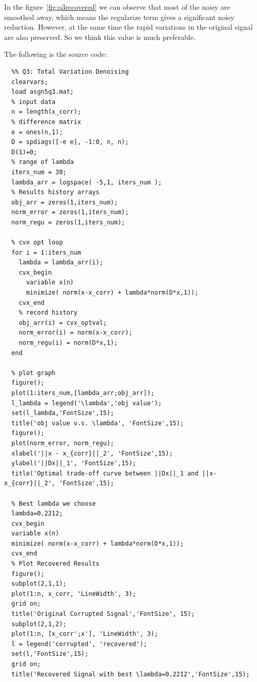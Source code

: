 \documentclass[10pt,a4paper]{article}
\begin{document}
In the figure~\ref{fig:q3recovered} we can observe that most of the noisy are
smoothed away, which means the regularize term gives a
significant noisy reduction. However, at the same time the
rapid variations in the original signal are also preserved.
So we think this value is much preferable.


The following is the source code:
\begin{lstlisting}
  %% Q3: Total Variation Denoising
  clearvars;
  load asgn5q3.mat;
  % input data
  n = length(x_corr);
  % difference matrix
  e = ones(n,1);
  D = spdiags([-e e], -1:0, n, n);
  D(1)=0;
  % range of lambda
  iters_num = 30;
  lambda_arr = logspace( -5,1, iters_num );
  % Results history arrays
  obj_arr = zeros(1,iters_num);
  norm_error = zeros(1,iters_num);
  norm_regu = zeros(1,iters_num);

  % cvx opt loop
  for i = 1:iters_num
    lambda = lambda_arr(i);
    cvx_begin
      variable x(n)
      minimize( norm(x-x_corr) + lambda*norm(D*x,1));
    cvx_end
    % record history
    obj_arr(i) = cvx_optval;
    norm_error(i) = norm(x-x_corr);
    norm_regu(i) = norm(D*x,1);
  end

  % plot graph
  figure();
  plot(1:iters_num,[lambda_arr;obj_arr]);
  l_lambda = legend('\lambda','obj value');
  set(l_lambda,'FontSize',15);
  title('obj value v.s. \lambda', 'FontSize',15);
  figure();
  plot(norm_error, norm_regu);
  xlabel('||x - x_{corr}||_2', 'FontSize',15);
  ylabel('||Dx||_1', 'FontSize',15);
  title('Optimal trade-off curve between ||Dx||_1 and ||x-x_{corr}||_2', 'FontSize',15);

  % Best lambda we choose
  lambda=0.2212;
  cvx_begin
  variable x(n)
  minimize( norm(x-x_corr) + lambda*norm(D*x,1));
  cvx_end
  % Plot Recovered Results
  figure();
  subplot(2,1,1);
  plot(1:n, x_corr, 'LineWidth', 3);
  grid on;
  title('Original Corrupted Signal','FontSize', 15);
  subplot(2,1,2);
  plot(1:n, [x_corr';x'], 'LineWidth', 3);
  l = legend('corrupted', 'recovered');
  set(l,'FontSize',15);
  grid on;
  title('Recovered Signal with best \lambda=0.2212','FontSize',15);
\end{lstlisting}

	\renewcommand\refname{Bibliography}
	
	
\end{document}
